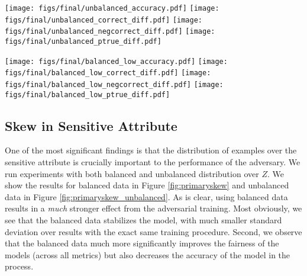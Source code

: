 \documentclass[sigconf,9pt]{acmart}
\begin{document}
\begin{figure*}[tbh]
    \centering
    \texttt{[image: figs/final/unbalanced\_accuracy.pdf]}
    \texttt{[image: figs/final/unbalanced\_correct\_diff.pdf]}
    \texttt{[image: figs/final/unbalanced\_negcorrect\_diff.pdf]}
    \texttt{[image: figs/final/unbalanced\_ptrue\_diff.pdf]}
    \vspace{-2mm}
    \caption{Fairness from different distributions over the primary label $Y$ (while unbalanced in the sensitive attribute $Z$).}
    \label{fig:primaryskew_unbalanced}
\end{figure*}

\begin{figure*}[tbh]
    \centering
    \texttt{[image: figs/final/balanced\_low\_accuracy.pdf]}
    \texttt{[image: figs/final/balanced\_low\_correct\_diff.pdf]}
    \texttt{[image: figs/final/balanced\_low\_negcorrect\_diff.pdf]}
    \texttt{[image: figs/final/balanced\_low\_ptrue\_diff.pdf]}
    \vspace{-2mm}
    \caption{Effect of dataset size (for dataset balanced across gender $Z$ and only including low-income examples).}
    \label{fig:datasize_low}
\end{figure*}

\subsection{Skew in Sensitive Attribute}
One of the most significant findings is that the distribution of examples over the sensitive attribute is crucially important to the performance of the adversary.  We run experiments with both balanced and unbalanced distribution over $Z$.  We show the results for balanced data in Figure \ref{fig:primaryskew} and unbalanced data in Figure \ref{fig:primaryskew_unbalanced}.  As is clear, using balanced data results in a \emph{much} stronger effect from the adversarial training.  Most obviously, we see that the balanced data stabilizes the model, with much smaller standard deviation over results with the exact same training procedure.  Second, we observe that the balanced data much more significantly improves the fairness of the models (across all metrics) but also decreases the accuracy of the model in the process.  
\end{document}

